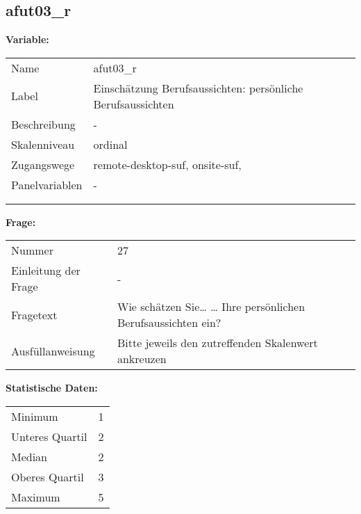	
	
	\subsection{afut03\_r}
	\label{subSection:afut03_r}

	\noindent\textbf{Variable:}\\
		\begin{tabular}{lL{11.3cm}}
			\label{tableVariable:afut03_r}
			Name & afut03\_r \\
			Label & Einschätzung Berufsaussichten: persönliche Berufsaussichten \\
			Beschreibung & - \\
			Skalenniveau & ordinal \\
			Zugangswege &
				remote-desktop-suf,
				onsite-suf,
 \\
			Panelvariablen & -
			 \\
			 \\
 \\
		\end{tabular}

		\vspace*{1 cm}
		\noindent\textbf{Frage:}\\
		\begin{tabular}{lL{11.3cm}}
			\label{tableQuestion:afut03_r}
			Nummer & 27 \\
			Einleitung der Frage & - \\
			Fragetext & Wie schätzen Sie…
… Ihre persönlichen Berufsaussichten ein? \\
			Ausfüllanweisung & Bitte jeweils den zutreffenden
Skalenwert ankreuzen \\
		\end{tabular}


		\vspace*{1 cm}
		\noindent\textbf{Statistische Daten:}\\
			\begin{tabular}{ll}
				\label{tableStatistics:afut03_r}
					Minimum & 1 \\
					Unteres Quartil & 2 \\
					Median & 2 \\
					Oberes Quartil & 3 \\
					Maximum & 5 \\
			\end{tabular}



